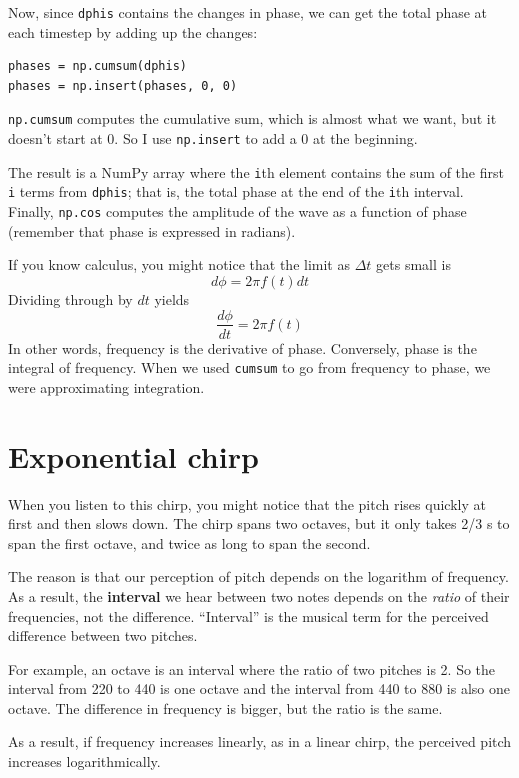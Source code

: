 \documentclass[12pt]{book}
\begin{document}
Now, since {\tt dphis} contains the changes in phase, we can
get the total phase at each timestep by adding up the changes:

\begin{verbatim}
phases = np.cumsum(dphis)
phases = np.insert(phases, 0, 0)
\end{verbatim}

{\tt np.cumsum} computes the cumulative sum, which is almost
what we want, but it doesn't start at 0.  So I use {\tt np.insert}
to add a 0 at the beginning.

The result is a NumPy array where the {\tt i}th element contains the
sum of the first {\tt i} terms from {\tt dphis}; that is, the total
phase at the end of the {\tt i}th interval.  Finally, {\tt np.cos}
computes the amplitude of the wave as a function of phase (remember
that phase is expressed in radians).

If you know calculus, you might notice that the limit as
$\Delta t$ gets small is
%
\[ d\phi = 2 \pi f(t) dt \]
%
Dividing through by $dt$ yields
%
\[ \frac{d\phi}{dt} = 2 \pi f(t) \]
%
In other words, frequency is the derivative of phase.  Conversely,
phase is the integral of frequency.  When we used {\tt cumsum}
to go from frequency to phase, we were approximating integration.


\section{Exponential chirp}

When you listen to this chirp, you might notice that the pitch
rises quickly at first and then slows down.
The chirp spans two octaves, but it only takes 2/3 s to span
the first octave, and twice as long to span the second.  

The reason is that our perception of pitch depends on the logarithm of
frequency.  As a result, the {\bf interval} we hear between two notes
depends on the {\em ratio} of their frequencies, not the difference.
``Interval'' is the musical term for the perceived difference between
two pitches.

For example, an octave is an interval where the ratio of two
pitches is 2.  So the interval from 220 to 440 is one octave
and the interval from 440 to 880 is also one octave.  The difference
in frequency is bigger, but the ratio is the same.

As a result, if frequency increases linearly, as in a linear
chirp, the perceived pitch increases logarithmically.
\end{document}
